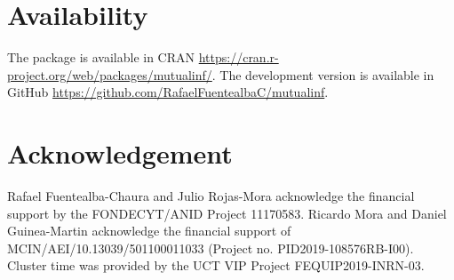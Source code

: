 \section{Availability}
The package is available in CRAN \url{https://cran.r-project.org/web/packages/mutualinf/}. The development version is available in GitHub \url{https://github.com/RafaelFuentealbaC/mutualinf}.

\section{Acknowledgement}
Rafael Fuentealba-Chaura and Julio Rojas-Mora acknowledge the financial support by the FONDECYT/ANID Project 11170583. Ricardo Mora and Daniel Guinea-Martin acknowledge the financial support of MCIN/AEI/10.13039/501100011033 (Project no. PID2019-108576RB-I00). Cluster time was provided by the UCT VIP Project FEQUIP2019-INRN-03.



\address{Rafael Fuentealba-Chaura\\
  School of Computer Science\\
  Universidad Católica de Temuco\\
  Temuco, Chile\\}

\address{Daniel Guinea-Martin\\
  Department of Sociology \\
  Universidad de Málaga (UMA)\\
  Málaga, Spain\\}

\address{Ricardo Mora\\
  Department of Economics\\
  Universidad Carlos III de Madrid\\
  Getafe, Spain\\}

\address{Julio Rojas-Mora\\
  Department of Computer Science\\
  Universidad Católica de Temuco\\
  Temuco, Chile\\}




